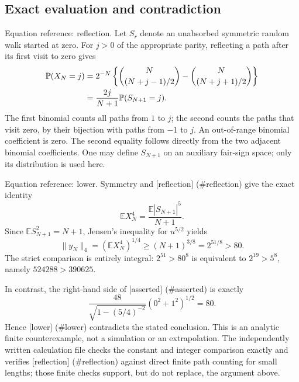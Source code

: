 \documentclass[10pt]{article}
\begin{document}
\subsection*{Exact evaluation and contradiction}
Equation reference: reflection. Let \(S_r\) denote an unabsorbed symmetric random walk started at zero. For \(j>0\) of the appropriate parity, reflecting a path after its first visit to zero gives \[\begin{aligned}
 \mathbb P(X_N=j)
 &=2^{-N}\left\{
 \binom{N}{(N+j-1)/2}-\binom{N}{(N+j+1)/2}\right\}\notag\\
 &=\frac{2j}{N+1}\mathbb P(S_{N+1}=j).\end{aligned}\] The first binomial counts all paths from \(1\) to \(j\); the second counts the paths that visit zero, by their bijection with paths from \(-1\) to \(j\). An out-of-range binomial coefficient is zero. The second equality follows directly from the two adjacent binomial coefficients. One may define \(S_{N+1}\) on an auxiliary fair-sign space; only its distribution is used here.\par
Equation reference: lower. Symmetry and [reflection] (\#reflection) give the exact identity \[\mathbb EX_N^4=\frac{\mathbb E|S_{N+1}|^5}{N+1}.\] Since \(\mathbb ES_{N+1}^2=N+1\), Jensen’s inequality for \(u^{5/2}\) yields \[
 \|y_N\|_4=(\mathbb EX_N^4)^{1/4}
 \ge (N+1)^{3/8}=2^{51/8}>80.\] The strict comparison is entirely integral: \(2^{51}>80^8\) is equivalent to \(2^{19}>5^8\), namely \(524288>390625\).\par
In contrast, the right-hand side of [asserted] (\#asserted) is exactly \[\frac{48}{\sqrt{1-(5/4)^{-2}}}
 (0^2+1^2)^{1/2}=80.\] Hence [lower] (\#lower) contradicts the stated conclusion. This is an analytic finite counterexample, not a simulation or an extrapolation. The independently written calculation file checks the constant and integer comparison exactly and verifies [reflection] (\#reflection) against direct finite path counting for small lengths; those finite checks support, but do not replace, the argument above.\par
\end{document}
